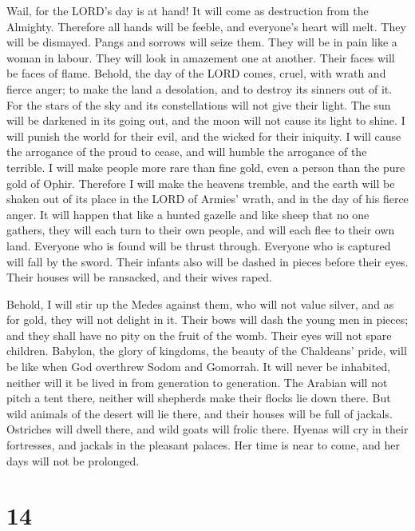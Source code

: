  Wail, for the LORD's day is at hand! It will come as
destruction from the Almighty.  Therefore all hands will be
feeble, and everyone's heart will melt.  They will be
dismayed. Pangs and sorrows will seize them. They will be in pain like a
woman in labour. They will look in amazement one at another. Their faces
will be faces of flame.  Behold, the day of the LORD comes,
cruel, with wrath and fierce anger; to make the land a desolation, and
to destroy its sinners out of it.  For the stars of the sky
and its constellations will not give their light. The sun will be
darkened in its going out, and the moon will not cause its light to
shine.  I will punish the world for their evil, and the
wicked for their iniquity. I will cause the arrogance of the proud to
cease, and will humble the arrogance of the terrible.  I
will make people more rare than fine gold, even a person than the pure
gold of Ophir.  Therefore I will make the heavens tremble,
and the earth will be shaken out of its place in the LORD of Armies'
wrath, and in the day of his fierce anger.  It will happen
that like a hunted gazelle and like sheep that no one gathers, they will
each turn to their own people, and will each flee to their own land.
 Everyone who is found will be thrust through. Everyone who
is captured will fall by the sword.  Their infants also
will be dashed in pieces before their eyes. Their houses will be
ransacked, and their wives raped.

 Behold, I will stir up the Medes against them, who will
not value silver, and as for gold, they will not delight in it.
 Their bows will dash the young men in pieces; and they
shall have no pity on the fruit of the womb. Their eyes will not spare
children.  Babylon, the glory of kingdoms, the beauty of
the Chaldeans' pride, will be like when God overthrew Sodom and
Gomorrah.  It will never be inhabited, neither will it be
lived in from generation to generation. The Arabian will not pitch a
tent there, neither will shepherds make their flocks lie down there.
 But wild animals of the desert will lie there, and their
houses will be full of jackals. Ostriches will dwell there, and wild
goats will frolic there.  Hyenas will cry in their
fortresses, and jackals in the pleasant palaces. Her time is near to
come, and her days will not be prolonged.

\hypertarget{section-13}{%
\section{14}\label{section-13}}

